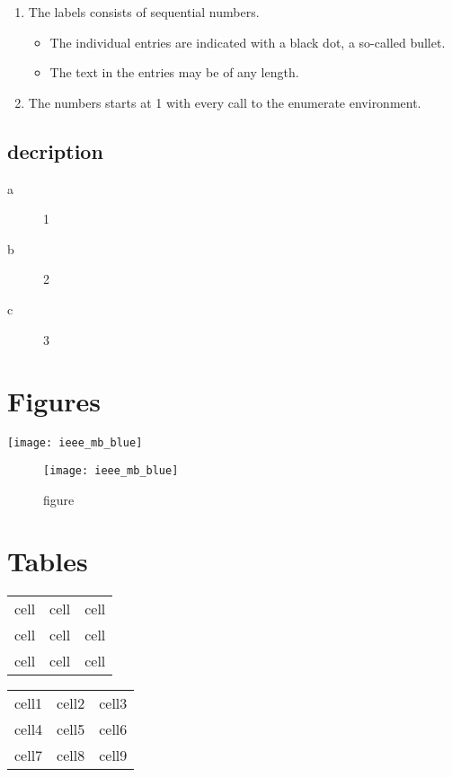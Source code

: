 \begin{enumerate}
  \item The labels consists of sequential numbers.
        \begin{itemize}
          \item The individual entries are indicated with a black dot, a so-called bullet.
          \item The text in the entries may be of any length.
        \end{itemize}
  \item The numbers starts at 1 with every call to the enumerate environment.
\end{enumerate}

\subsection{decription}

\begin{description}
  \item[a] 1
  \item[b] 2
  \item[c] 3
\end{description}

\section{Figures}
\label{sec:figures}

\texttt{[image: ieee\_mb\_blue]}

\begin{figure}[h]
  \centering
  \texttt{[image: ieee\_mb\_blue]}
  \caption{figure}
  \label{fig:ieee}
\end{figure}

\section{Tables}
\label{sec:tables}

\begin{center}
  \begin{tabular}{c c c}
    cell & cell & cell \\
    cell & cell & cell \\
    cell & cell & cell
  \end{tabular}
\end{center}

\begin{center}
  \begin{tabular}{|c|c|c|}
    \hline
    cell1 & cell2 & cell3 \\
    cell4 & cell5 & cell6 \\
    cell7 & cell8 & cell9 \\
    \hline
  \end{tabular}
\end{center}

